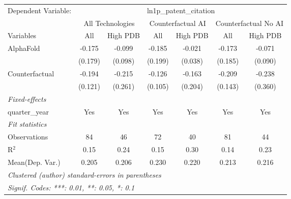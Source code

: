 \begingroup
\centering
\begin{tabular}{lcccccc}
   \tabularnewline \midrule \midrule
   Dependent Variable: & \multicolumn{6}{c}{ln1p\_patent\_citation}\\
 & \multicolumn{2}{c}{All Technologies} & \multicolumn{2}{c}{Counterfactual AI} & \multicolumn{2}{c}{Counterfactual No AI} \\
\cmidrule(lr){1-1}\cmidrule(lr){2-3} \cmidrule(lr){4-5} \cmidrule(lr){6-7}
Variables & \multicolumn{1}{c}{All} & \multicolumn{1}{c}{High PDB} & \multicolumn{1}{c}{All} & \multicolumn{1}{c}{High PDB} & \multicolumn{1}{c}{All} & \multicolumn{1}{c}{High PDB} \\
\cmidrule(lr){1-1}\cmidrule(lr){2-2} \cmidrule(lr){3-3} \cmidrule(lr){4-4} \cmidrule(lr){5-5} \cmidrule(lr){6-6} \cmidrule(lr){7-7}
   AlphaFold      & -0.175  & -0.099  & -0.185  & -0.021  & -0.173  & -0.071\\   
                  & (0.179) & (0.098) & (0.199) & (0.038) & (0.185) & (0.090)\\   
   Counterfactual & -0.194  & -0.215  & -0.126  & -0.163  & -0.209  & -0.238\\   
                  & (0.121) & (0.261) & (0.105) & (0.204) & (0.143) & (0.360)\\   
   \midrule
   \emph{Fixed-effects}\\
   quarter\_year  & Yes     & Yes     & Yes     & Yes     & Yes     & Yes\\  
   \midrule
   \emph{Fit statistics}\\
   Observations   & 84      & 46      & 72      & 40      & 81      & 44\\  
   R$^2$          & 0.15    & 0.24    & 0.15    & 0.30    & 0.14    & 0.23\\  
Mean(Dep. Var.) & 0.205 & 0.206 & 0.230 & 0.220 & 0.213 & 0.216 \\
   \midrule \midrule
   \multicolumn{7}{l}{\emph{Clustered (author) standard-errors in parentheses}}\\
   \multicolumn{7}{l}{\emph{Signif. Codes: ***: 0.01, **: 0.05, *: 0.1}}\\
\end{tabular}
\par\endgroup
